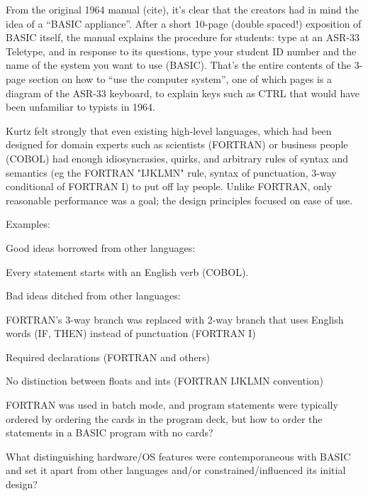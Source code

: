 \documentclass{article}
\begin{document}
From the original 1964 manual (cite), it's clear that the creators had
in mind the idea of a ``BASIC appliance''.  After a short 10-page
(double spaced!) exposition of BASIC itself, the manual
explains the procedure for students: type  at an ASR-33
Teletype, and in response to its questions, type your student ID number
and the name of the system you want to use (BASIC).  That's the entire
contents of the  3-page section on how to ``use the computer system'',
one of which pages is a diagram of the ASR-33 keyboard,
to explain keys such as CTRL that would have been unfamiliar to
typists in 1964.


Kurtz felt strongly that even existing high-level
languages, which had been designed for domain experts such as scientists
(FORTRAN) or business people (COBOL) 
had enough idiosyncrasies, quirks, and arbitrary rules of syntax and
semantics (eg the FORTRAN "IJKLMN" rule, syntax of punctuation, 3-way
conditional of FORTRAN I) to put off lay people.  Unlike FORTRAN,
only reasonable performance was a goal; the design principles focused on
ease of use.


Examples:

Good ideas borrowed from other languages:

Every statement starts with an English verb (COBOL).

Bad ideas ditched from other languages:

FORTRAN's 3-way branch was replaced with 2-way branch that uses English words (IF,
THEN) instead of punctuation (FORTRAN I)

Required declarations (FORTRAN and others)

No distinction between floats and ints (FORTRAN IJKLMN convention)

FORTRAN was used in batch mode, and program statements were typically
ordered by ordering the cards in the program deck, but how to order the
statements in a BASIC program with no cards?

What distinguishing hardware/OS features were contemporaneous with BASIC
and set it apart from other languages and/or constrained/influenced its
initial design?
\end{document}
